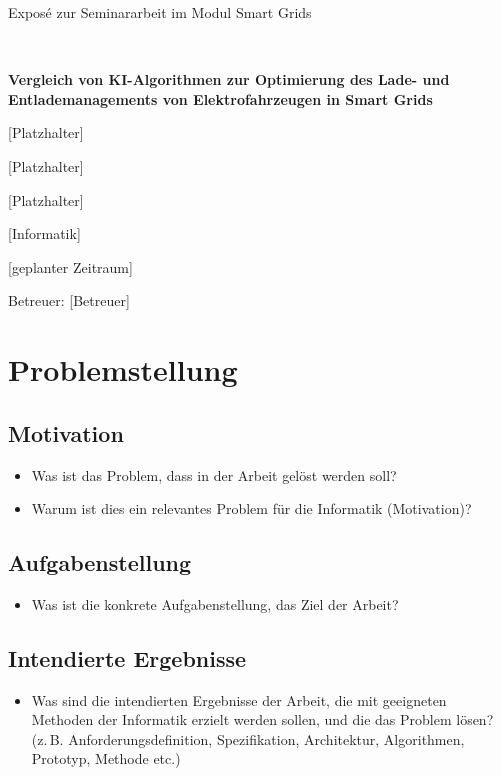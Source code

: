 \documentclass[12pt]{article} %
\begin{document}
\begin{center}
   \baselineskip
   
   Exposé zur Seminararbeit im Modul Smart Grids
   
   ~
   
   {\LARGE\bfseries
      Vergleich von KI-Algorithmen zur Optimierung des Lade- und Entlademanagements von Elektrofahrzeugen in Smart Grids}

   \large
   [Platzhalter]
   
   [Platzhalter]
   
   [Platzhalter]
   
   [Informatik]
   
   [geplanter Zeitraum]
   
   Betreuer: [Betreuer]
\end{center}

\section{Problemstellung}

\subsection{Motivation}
\begin{itemize}
\item Was ist das Problem, dass in der Arbeit gelöst werden soll?
\item Warum ist dies ein relevantes Problem für die Informatik (Motivation)?
\end{itemize}

\subsection{Aufgabenstellung}
\begin{itemize}
\item Was ist die konkrete Aufgabenstellung, das Ziel der Arbeit?
\end{itemize}

\subsection{Intendierte Ergebnisse}
\begin{itemize}
\item Was sind die intendierten Ergebnisse der Arbeit, die mit geeigneten Methoden
der Informatik erzielt werden sollen, und die das Problem lösen?
(z.\,B. Anforderungsdefinition, Spezifikation, Architektur, Algorithmen, Prototyp, Methode etc.)
\end{itemize}
\end{document}
